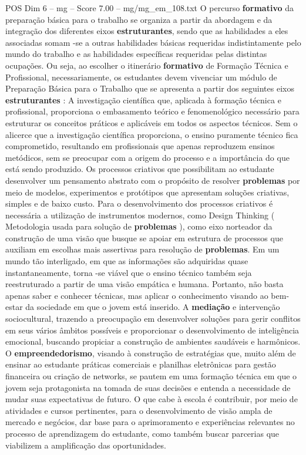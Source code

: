 \begin{textsample}{POS Dim 6 – mg – Score 7.00 – mg/mg\_em\_108.txt}
O percurso \textbf{formativo} da preparação básica para o trabalho se organiza a partir da abordagem e da integração dos diferentes eixos \textbf{estruturantes}, sendo que as habilidades a eles associadas somam -se a outras habilidades básicas requeridas indistintamente pelo mundo do trabalho e as habilidades específicas requeridas pelas distintas ocupações.
Ou seja, ao escolher o itinerário \textbf{formativo} de Formação Técnica e Profissional, necessariamente, os estudantes devem vivenciar um módulo de Preparação Básica para o Trabalho que se apresenta a partir dos seguintes eixos \textbf{estruturantes} : A investigação científica que, aplicada à formação técnica e profissional, proporciona o embasamento teórico e fenomenológico necessário para estruturar os conceitos práticos e aplicáveis em todos os aspectos técnicos.
Sem o alicerce que a investigação científica proporciona, o ensino puramente técnico fica comprometido, resultando em profissionais que apenas reproduzem ensinos metódicos, sem se preocupar com a origem do processo e a importância do que está sendo produzido.
Os processos criativos que possibilitam ao estudante desenvolver um pensamento abstrato com o propósito de resolver \textbf{problemas} por meio de modelos, experimentos e protótipos que apresentam soluções criativas, simples e de baixo custo.
Para o desenvolvimento dos processos criativos é necessária a utilização de instrumentos modernos, como Design Thinking ( Metodologia usada para solução de \textbf{problemas} ), como eixo norteador da construção de uma visão que busque se apoiar em estrutura de processos que auxiliam em escolhas mais assertivas para resolução de \textbf{problemas}.
Em um mundo tão interligado, em que as informações são adquiridas quase instantaneamente, torna -se viável que o ensino técnico também seja reestruturado a partir de uma visão empática e humana.
Portanto, não basta apenas saber e conhecer técnicas, mas aplicar o conhecimento visando ao bem-estar da sociedade em que o jovem está inserido.
A \textbf{mediação} e intervenção sociocultural, trazendo a preocupação em desenvolver soluções para gerir conflitos em seus vários âmbitos possíveis e proporcionar o desenvolvimento de inteligência emocional, buscando propiciar a construção de ambientes saudáveis e harmônicos.
O \textbf{empreendedorismo}, visando à construção de estratégias que, muito além de ensinar ao estudante práticas comerciais e planilhas eletrônicas para gestão financeira ou criação de networks, se pautem em uma formação técnica em que o jovem seja protagonista na tomada de suas decisões e entenda a necessidade de mudar suas expectativas de futuro.
O que cabe à escola é contribuir, por meio de atividades e cursos pertinentes, para o desenvolvimento de visão ampla de mercado e negócios, dar base para o aprimoramento e experiências relevantes no processo de aprendizagem do estudante, como também buscar parcerias que viabilizem a amplificação das oportunidades.

\end{textsample}

